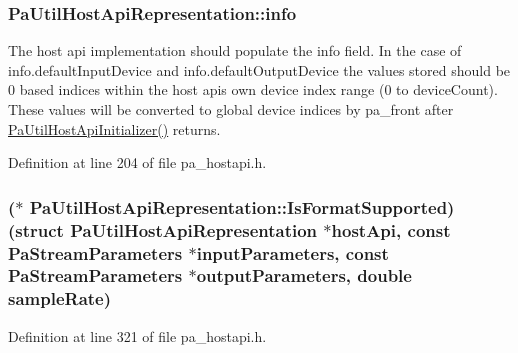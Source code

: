 \subsubsection[{\texorpdfstring{info}{info}}]{ Pa\+Util\+Host\+Api\+Representation\+::info}\hypertarget{struct_pa_util_host_api_representation_a9c443aa6cf07d3c46167a91b274a9e94}{}\label{struct_pa_util_host_api_representation_a9c443aa6cf07d3c46167a91b274a9e94}
The host api implementation should populate the info field. In the case of info.\+default\+Input\+Device and info.\+default\+Output\+Device the values stored should be 0 based indices within the host api\textquotesingle{}s own device index range (0 to device\+Count). These values will be converted to global device indices by pa\+\_\+front after \hyperlink{pa__hostapi_8h_ab0c89969a0c6107e7bf8e8f96adaa72d}{Pa\+Util\+Host\+Api\+Initializer()} returns. 

Definition at line 204 of file pa\+\_\+hostapi.\+h.

\subsubsection[{\texorpdfstring{Is\+Format\+Supported}{IsFormatSupported}}]{($\ast$ Pa\+Util\+Host\+Api\+Representation\+::\+Is\+Format\+Supported) (struct {\bf Pa\+Util\+Host\+Api\+Representation} $\ast$host\+Api, {\bf const} {\bf Pa\+Stream\+Parameters} $\ast$input\+Parameters, {\bf const} {\bf Pa\+Stream\+Parameters} $\ast$output\+Parameters, double sample\+Rate)}\hypertarget{struct_pa_util_host_api_representation_a54205572c891d43272de45be0994c377}{}\label{struct_pa_util_host_api_representation_a54205572c891d43272de45be0994c377}


Definition at line 321 of file pa\+\_\+hostapi.\+h.

